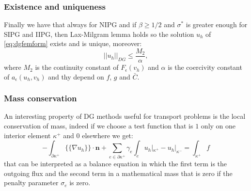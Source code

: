 \documentclass[12pt, a4paper]{article}
\theoremstyle{definition}
\theoremstyle{plain}
\theoremstyle{plain}
\begin{document}
\subsubsection{Existence and uniqueness}
Finally we have that always for NIPG and if $\beta \geq 1/2$ and $\sigma^*$ is greater enough for SIPG and IIPG, then Lax-Milgram lemma holds so the solution $u_h$ of \eqref{eq:dgfemform} exists and is unique, moreover:\\
\begin{equation*}
	|\!|u_h|\!|_{DG} \leq \frac{M_2}{\alpha},
\end{equation*}
where $M_2$ is the continuity constant of $F_\epsilon(v_h)$ and $\alpha$ is the coercivity constant of $a_\epsilon(u_h,v_h)$ and thy depend on $f$, $g$ and $\bar{C}$.
\subsubsection{Mass conservation}
An interesting property of DG methods useful for transport problems is the local conservation of mass, indeed if we choose a test function that is $1$ only on one interior element $\kappa^+$ and $0$ elsewhere we get:
\begin{equation*}
	- \int_{\partial \kappa^+} \{\!\!\{ \nabla u_h \}\!\!\} \cdot \mathbf{n} + \sum_{e \in \partial \kappa^+} \gamma_e \int_e u_h|_{\kappa^+} - u_h|_{\kappa^-} = \int_{\kappa^+} f
\end{equation*}
that can be interpreted as a balance equation in which the first term is the outgoing flux and the second term in a mathematical mass that is zero if the penalty parameter $\sigma_e$ is zero.
\end{document}
